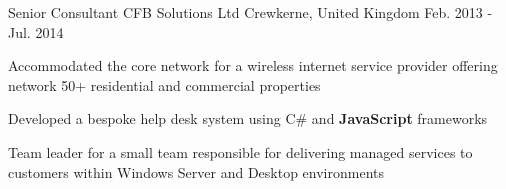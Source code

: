 \begin{cventries}
  \cventry
    {Senior Consultant} %
    {CFB Solutions Ltd} %
    {Crewkerne, United Kingdom} %
    {Feb. 2013 - Jul. 2014} %
    {
      \begin{cvitems} %
        \item {Accommodated the core network for a wireless internet service provider offering network 50+ residential and commercial properties}
        \item {Developed a bespoke help desk system using C\# and \textbf{JavaScript} frameworks}
        \item {Team leader for a small team responsible for delivering managed services to customers within Windows Server and Desktop environments}
      \end{cvitems}
    }

\end{cventries}
